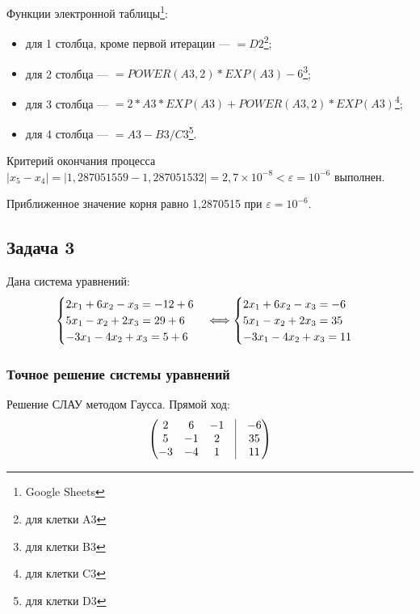 \documentclass[10pt, a4paper, titlepage]{article}
\begin{document}
Функции электронной таблицы\footnote{Google Sheets}:
\begin{itemize}
    \item для 1 столбца, кроме первой итерации --- $=D2$\footnote{для клетки A3};
    
    \item для 2 столбца --- $=POWER(A3,2)*EXP(A3)-6$\footnote{для клетки B3};
    
    \item для 3 столбца --- $=2*A3*EXP(A3)+POWER(A3,2)*EXP(A3)$\footnote{для клетки C3};
    
    \item для 4 столбца --- $=A3-B3/C3$\footnote{для клетки D3}.
\end{itemize}

Критерий окончания процесса $|x_5-x_4|=|1,287051559-1,287051532 |=2,7\times10^{-8}<\varepsilon=10^{-6}$ выполнен. 

Приближенное значение корня равно 1,2870515 при $\varepsilon=10^{-6}$.

\subsection{Задача 3}

Дана система уравнений:
\begin{equation*}
    \begin{cases}
        $$2x_1+6x_2-x_3=-12+6$$ \\
        $$5x_1-x_2+2x_3=29+6$$ \\
        $$-3x_1-4x_2+x_3=5+6$$
    \end{cases}
    \Longleftrightarrow
    \begin{cases}
        $$2x_1+6x_2-x_3=-6$$ \\
        $$5x_1-x_2+2x_3=35$$ \\
        $$-3x_1-4x_2+x_3=11$$
    \end{cases}
\end{equation*}


\subsubsection*{Точное решение системы уравнений}

Решение СЛАУ методом Гаусса. Прямой ход:
\begin{equation*}
    \begin{pmatrix}
        2 & 6 & -1 & \vrule & -6 \\
        5 & -1 & 2 & \vrule & 35 \\
        -3 & -4 & 1 & \vrule & 11
    \end{pmatrix}
\end{equation*}
\end{document}
